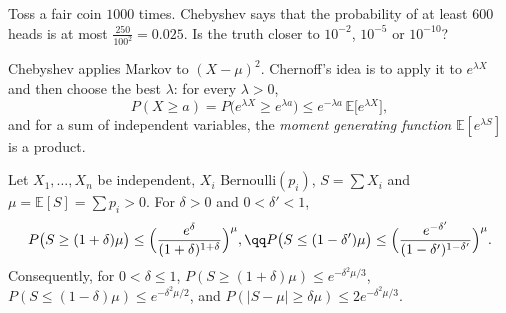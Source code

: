 \begin{think}
Toss a fair coin $1000$ times. Chebyshev says that the probability of at least $600$ heads is at most
$\frac{250}{100^2}=0.025$. Is the truth closer to $10^{-2}$, $10^{-5}$ or $10^{-10}$?
\end{think}

Chebyshev applies Markov to $(X-\mu)^2$. Chernoff's idea is to apply it to $e^{\lambda X}$ and then choose the best $\lambda$: for
every $\lambda>0$,
\[
P(X\ge a)=P\bigl(e^{\lambda X}\ge e^{\lambda a}\bigr)\le e^{-\lambda a}\,\mathbb E\bigl[e^{\lambda X}\bigr],
\]
and for a sum of independent variables, the \emph{moment generating function} $\mathbb E[e^{\lambda S}]$ is a product.

\begin{theorem}\label{thm:chernoff}
Let $X_1,\dots,X_n$ be independent, $X_i$ Bernoulli$(p_i)$, $S=\sum X_i$ and $\mu=\mathbb E[S]=\sum p_i>0$. For $\delta>0$ and $0<\delta'<1$,
\[
\begin{gathered}
P\bigl(S\ge(1+\delta)\mu\bigr)\le\Bigl(\frac{e^\delta}{(1+\delta)^{1+\delta}}\Bigr)^{\mu},\qq P\bigl(S\le(1-\delta')\mu\bigr)\le\Bigl(\frac{e^{-\delta'}}{(1-\delta')^{1-\delta'}}\Bigr)^{\mu}.
\end{gathered}
\]
Consequently, for $0<\delta\le1$, $P(S\ge(1+\delta)\mu)\le e^{-\delta^2\mu/3}$, $P(S\le(1-\delta)\mu)\le e^{-\delta^2\mu/2}$, and
$P(|S-\mu|\ge\delta\mu)\le2e^{-\delta^2\mu/3}$.
\end{theorem}

